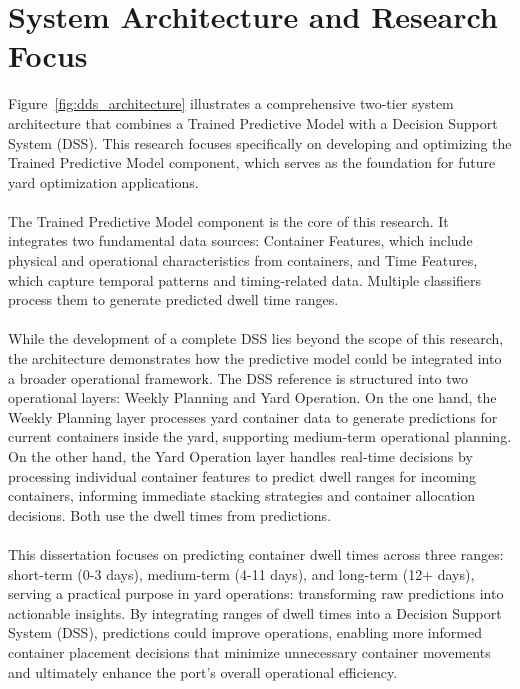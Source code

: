 	\section{System Architecture and Research Focus}

		Figure~\ref{fig:dds_architecture}
		illustrates a comprehensive two-tier system architecture that combines a Trained Predictive Model
		with a Decision Support System (DSS). This research focuses specifically on developing and optimizing
		the Trained Predictive Model component, which serves as the foundation for future yard optimization
		applications.
		\\
		\\
		The Trained Predictive Model component is the core of this research. It integrates two fundamental data
		sources: Container Features, which include physical and operational characteristics from containers, and Time
		Features, which capture temporal patterns and timing-related data. Multiple classifiers process them to
		generate predicted dwell time ranges.
		\\
		\\
		While the development of a complete DSS lies beyond the scope of this research, the architecture demonstrates
		how the predictive model could be integrated into a broader operational framework. The DSS reference is
		structured into two operational layers: Weekly Planning and Yard Operation. On the one hand, the Weekly
		Planning layer processes yard container data to generate predictions for current containers inside the yard,
		supporting medium-term operational planning. On the other hand, the Yard Operation layer handles real-time
		decisions by processing individual container features to predict dwell ranges for incoming containers,
		informing immediate stacking strategies and container allocation decisions. Both use the dwell times from
		predictions.
		\\
		\\
		This dissertation focuses on predicting container dwell times across three ranges: short-term (0-3 days),
		medium-term (4-11 days), and long-term (12+ days), serving a practical purpose in yard operations: transforming
		raw predictions into actionable insights. By integrating ranges of dwell times into a Decision Support System
		(DSS), predictions could improve operations, enabling more informed container placement decisions that minimize
		unnecessary container movements and ultimately enhance the port's overall operational efficiency.

